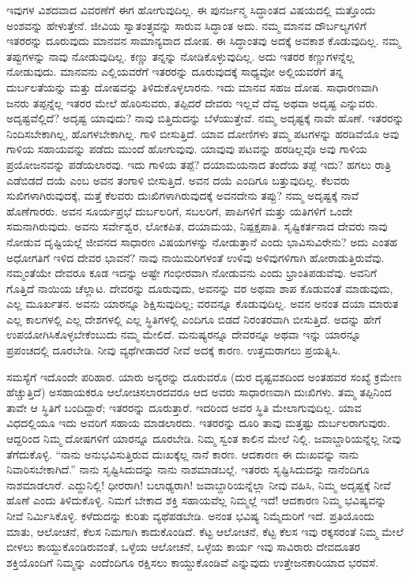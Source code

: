 ಇವುಗಳ ವಿಶದವಾದ ವಿವರಣೆಗೆ ಈಗ ಹೋಗುವುದಿಲ್ಲ. ಈ ಪುನರ್ಜನ್ಮ ಸಿದ್ಧಾಂತದ ವಿಷಯದಲ್ಲಿ ಮತ್ತೊಂದು ಅಂಶವನ್ನು ಹೇಳುತ್ತೇನೆ. ಜೀವಿಯ ಸ್ವಾತಂತ್ರ್ಯವನ್ನು ಸಾರುವ ಸಿದ್ಧಾಂತ ಅದು. ನಮ್ಮ ಮಾನವ ದೌರ್ಬಲ್ಯಗಳಿಗೆ ಇತರರನ್ನು ದೂರುವುದು ಮಾನವನ ಸಾಮಾನ್ಯವಾದ ದೋಷ. ಈ ಸಿದ್ಧಾಂತವು ಅದಕ್ಕೆ ಅವಕಾಶ ಕೊಡುವುದಿಲ್ಲ. ನಮ್ಮ ತಪ್ಪುಗಳನ್ನು ನಾವು ನೋಡುವುದಿಲ್ಲ. ಕಣ್ಣು ತನ್ನನ್ನು ನೋಡಿಕೊಳ್ಳುವುದಿಲ್ಲ. ಅದು ಇತರರ ಕಣ್ಣುಗಳನ್ನೆಲ್ಲ ನೋಡುವುದು. ಮಾನವನು ಎಲ್ಲಿಯವರೆಗೆ ಇತರರನ್ನು ದೂರುವುದಕ್ಕೆ ಸಾಧ್ಯವೋ ಅಲ್ಲಿಯವರೆಗೆ ತನ್ನ ದುರ್ಬಲತೆಯನ್ನು ಮತ್ತು ದೋಷವನ್ನು ತಿಳಿದುಕೊಳ್ಳಲಾರನು. ಇದು ಮಾನವ ಸಹಜ ದೋಷ. ಸಾಧಾರಣವಾಗಿ ಜನರು ತಪ್ಪನ್ನೆಲ್ಲ ಇತರರ ಮೇಲೆ ಹೊರಿಸುವರು, ತಪ್ಪಿದರೆ ದೇವರು ಇಲ್ಲವೆ ದೆವ್ವ ಅಥವಾ ಅದೃಷ್ಟ ಎನ್ನುವರು. ಅದೃಷ್ಟವೆಲ್ಲಿದೆ? ಅದೃಷ್ಟ ಯಾವುದು? ನಾವು ಬಿತ್ತಿದುದನ್ನು ಬೆಳೆಯುತ್ತೇವೆ. ನಮ್ಮ ಅದೃಷ್ಟಕ್ಕೆ ನಾವೇ ಹೊಣೆ. ಇತರರನ್ನು ನಿಂದಿಸಬೇಕಾಗಿಲ್ಲ, ಹೊಗಳಬೇಕಾಗಿಲ್ಲ. ಗಾಳಿ ಬೀಸುತ್ತಿದೆ. ಯಾವ ದೋಣಿಗಳು ತಮ್ಮ ಪಟಗಳನ್ನು ಹರಡಿವೆಯೊ ಅವು ಗಾಳಿಯ ಸಹಾಯವನ್ನು ಪಡೆದು ಮುಂದೆ ಹೋಗುವುವು. ಯಾವುವು ಪಟವನ್ನು ಹರಡಿಲ್ಲವೊ ಅವು ಗಾಳಿಯ ಪ್ರಯೋಜನವನ್ನು ಪಡೆಯಲಾರವು. ಇದು ಗಾಳಿಯ ತಪ್ಪೆ? ದಯಾಮಯನಾದ ತಂದೆಯ ತಪ್ಪೆ ಇದು? ಹಗಲು ರಾತ್ರಿ ಎಡೆಬಿಡದೆ ದಯೆ ಎಂಬ ಅವನ ತಂಗಾಳಿ ಬೀಸುತ್ತಿದೆ. ಅವನ ದಯೆ ಎಂದಿಗೂ ಬತ್ತುವುದಿಲ್ಲ. ಕೆಲವರು ಸುಖಿಗಳಾಗಿರುವುದಕ್ಕೆ, ಮತ್ತೆ ಕೆಲವರು ದುಃಖಿಗಳಾಗಿರುವುದಕ್ಕೆ ಅವನದೇನು ತಪ್ಪು? ನಮ್ಮ ಅದೃಷ್ಟಕ್ಕೆ ನಾವೆ ಹೊಣೆಗಾರರು. ಅವನ ಸೂರ್ಯಪ್ರಭೆ ದುರ್ಬಲರಿಗೆ, ಸಬಲರಿಗೆ, ಪಾಪಿಗಳಿಗೆ ಮತ್ತು ಯತಿಗಳಿಗೆ ಒಂದೇ ಸಮನಾಗಿರುವುದು. ಅವನು ಸರ್ವೇಶ್ವರ, ಲೋಕಪಿತ, ದಯಾಮಯ, ನಿಷ್ಪಕ್ಷಪಾತಿ. ಸೃಷ್ಟಿಕರ್ತನಾದ ದೇವರು ನಾವು ನೋಡುವ ದೃಷ್ಟಿಯಲ್ಲೆ ಜೀವನದ ಸಾಧಾರಣ ವಿಷಯಗಳನ್ನು ನೋಡುತ್ತಾನೆ ಎಂದು ಭಾವಿಸುವಿರೇನು? ಅದು ಎಂತಹ ಅಧೋಗತಿಗೆ ಇಳಿದ ದೇವರ ಭಾವನೆ? ನಾವು ನಾಯಿಮರಿಗಳಂತೆ ಉಳಿವು ಅಳಿವುಗಳಿಗಾಗಿ ಹೋರಾಡುತ್ತಿರುವೆವು. ನಮ್ಮಂತೆಯೇ ದೇವರೂ ಕೂಡ ಇದನ್ನು ಅಷ್ಟೇ ಗಂಭೀರವಾಗಿ ನೋಡುವನು ಎಂದು ಭ್ರಾಂತಿಪಡುವೆವು. ಅವನಿಗೆ ಗೊತ್ತಿದೆ ನಾಯಿಯ ಚೆಲ್ಲಾಟ. ದೇವರನ್ನು ದೂರುವುದು, ಅವನನ್ನು ವರ ಅಥವಾ ಶಾಪ ಕೊಡುವಂತೆ ಮಾಡುವುದು, ಎಲ್ಲ ಮೂರ್ಖತನ. ಅವನು ಯಾರನ್ನೂ ಶಿಕ್ಷಿಸುವುದಿಲ್ಲ; ವರವನ್ನೂ ಕೊಡುವುದಿಲ್ಲ. ಅವನ ಅನಂತ ದಯಾ ಮಾರುತ ಎಲ್ಲ ಕಾಲಗಳಲ್ಲಿ ಎಲ್ಲ ದೇಶಗಳಲ್ಲಿ ಎಲ್ಲ ಸ್ಥಿತಿಗಳಲ್ಲಿ ಎಂದಿಗೂ ಬಿಡದೆ ನಿರಂತರವಾಗಿ ಬೀಸುತ್ತಿದೆ. ಅದನ್ನು ಹೇಗೆ ಉಪಯೋಗಿಸಿಕೊಳ್ಳಬೇಕೆಂಬುದು ನಮ್ಮ ಮೇಲಿದೆ. ಮನುಷ್ಯರನ್ನೂ ದೇವರನ್ನೂ ಅಥವಾ ಇನ್ನು ಯಾರನ್ನೂ ಪ್ರಪಂಚದಲ್ಲಿ ದೂರಬೇಡಿ. ನೀವು ವ್ಯಥೆಗೀಡಾದರೆ ನೀವೆ ಅದಕ್ಕೆ ಕಾರಣ. ಉತ್ತಮರಾಗಲು ಪ್ರಯತ್ನಿಸಿ.


ಸಮಸ್ಯೆಗೆ ಇದೊಂದೇ ಪರಿಹಾರ. ಯಾರು ಅನ್ಯರನ್ನು ದೂರುವರೊ (ದುರ ದೃಷ್ಟವಶದಿಂದ ಅಂತಹವರ ಸಂಖ್ಯೆ ಕ್ರಮೇಣ ಹೆಚ್ಚುತ್ತಿದೆ) ಅಸಹಾಯಕರೂ ಆಲೋಚಿಸಲಾರದವರೂ ಆದ ಅವರು ಸಾಧಾರಣವಾಗಿ ದುಃಖಿಗಳು. ತಮ್ಮ ತಪ್ಪಿನಿಂದ ತಾವೇ ಆ ಸ್ಥಿತಿಗೆ ಬಂದಿದ್ದಾರೆ; ಇತರರನ್ನು ದೂರುತ್ತಾರೆ. ಇದರಿಂದ ಅವರ ಸ್ಥಿತಿ ಮೇಲಾಗುವುದಿಲ್ಲ. ಯಾವ ವಿಧದಲ್ಲಿಯೂ ಇದು ಅವರಿಗೆ ಸಹಾಯ ಮಾಡಲಾರದು. ಇತರರನ್ನು ದೂರಿ ತಾವು ಮತ್ತಷ್ಟು ದುರ್ಬಲರಾಗುವುರು. ಆದ್ದರಿಂದ ನಿಮ್ಮ ದೋಷಗಳಿಗೆ ಯಾರನ್ನೂ ದೂರಬೇಡಿ. ನಿಮ್ಮ ಸ್ವಂತ ಕಾಲಿನ ಮೇಲೆ ನಿಲ್ಲಿ. ಜವಾಬ್ದಾರಿಯನ್ನೆಲ್ಲ ನೀವು ತೆಗೆದುಕೊಳ್ಳಿ. “ನಾನು ಅನುಭವಿಸುತ್ತಿರುವ ದುಃಖಕ್ಕೆಲ್ಲ ನಾನೆ ಕಾರಣ. ಆದಕಾರಣ ಈ ದುಃಖವನ್ನು ನಾನು ನಿವಾರಿಸಬೇಕಾಗಿದೆ.” ನಾನು ಸೃಷ್ಟಿಸಿದುದನ್ನು ನಾನು ನಾಶಮಾಡಬಲ್ಲೆ. ಇತರರು ಸೃಷ್ಟಿಸಿದುದನ್ನು ನಾನೆಂದಿಗೂ ನಾಶಮಾಡಲಾರೆ. ಎದ್ದುನಿಲ್ಲಿ! ಧೀರರಾಗಿ! ಬಲಾಢ್ಯರಾಗಿ! ಜವಾಬ್ದಾರಿಯನ್ನೆಲ್ಲಾ ನೀವು ವಹಿಸಿ, ನಿಮ್ಮ ಅದೃಷ್ಟಕ್ಕೆ ನೀವೆ ಹೊಣೆ ಎಂದು ತಿಳಿದುಕೊಳ್ಳಿ. ನಿಮಗೆ ಬೇಕಾದ ಶಕ್ತಿ ಸಹಾಯವೆಲ್ಲ ನಿಮ್ಮಲ್ಲೆ ಇದೆ! ಆದಕಾರಣ ನಿಮ್ಮ ಭವಿಷ್ಯವನ್ನು ನೀವೆ ನಿರ್ಮಿಸಿಕೊಳ್ಳಿ. ಕಳೆದುದನ್ನು ಕುರಿತು ವ್ಯಥೆಪಡಬೇಡಿ. ಅನಂತ ಭವಿಷ್ಯ ನಿಮ್ಮೆದುರಿಗೆ ಇದೆ. ಪ್ರತಿಯೊಂದು ಮಾತು, ಆಲೋಚನೆ, ಕೆಲಸ ನಿಮಗಾಗಿ ಕಾದುಕೊಂಡಿದೆ. ಕೆಟ್ಟ ಆಲೋಚನೆ, ಕೆಟ್ಟ ಕೆಲಸ ಇವು ರಕ್ಕಸರಂತೆ ನಿಮ್ಮ ಮೇಲೆ ಬೀಳಲು ಕಾಯ್ದುಕೊಂಡಿರುವಂತೆ, ಒಳ್ಳೆಯ ಆಲೋಚನೆ, ಒಳ್ಳೆಯ ಕಾರ್ಯ ಇವು ಸಾವಿರಾರು ದೇವದೂತರ ಶಕ್ತಿಯೊಂದಿಗೆ ನಿಮ್ಮನ್ನು ಎಂದೆಂದಿಗೂ ರಕ್ಷಿಸಲು ಕಾಯ್ದುಕೊಂಡಿವೆ ಎನ್ನುವುದು ಉತ್ತೇಜನಕಾರಿಯಾದ ಭರವಸೆ.

